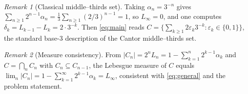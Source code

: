 \documentclass{amsart}
\theoremstyle{definition}
\theoremstyle{remark}
\newtheorem{remark}{Remark}
\begin{document}
\begin{remark}[Classical middle--thirds set]
Taking $\alpha_n=3^{-n}$ gives $\sum_{n\ge1}2^{n-1}\alpha_n=\tfrac13\sum_{n\ge1}(2/3)^{n-1}=1$,
so $L_\infty=0$, and one computes $\delta_k=L_{k-1}-L_k=2\cdot3^{-k}$. Then
\eqref{eq:main} reads
$C=\bigl\{\sum_{k\ge1}2\varepsilon_k 3^{-k}:\varepsilon_k\in\{0,1\}\bigr\}$, the
standard base-$3$ description of the Cantor middle--thirds set.
\end{remark}

\begin{remark}[Measure consistency]
From $|C_n|=2^nL_n=1-\sum_{k=1}^n2^{k-1}\alpha_k$ and $C=\bigcap_nC_n$ with
$C_{n}\subseteq C_{n-1}$, the Lebesgue measure of $C$ equals
$\lim_n|C_n|=1-\sum_{k=1}^{\infty}2^{k-1}\alpha_k=L_\infty$, consistent with
\eqref{eq:general} and the problem statement.
\end{remark}
\end{document}
